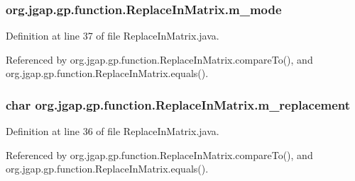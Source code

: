 \hypertarget{classorg_1_1jgap_1_1gp_1_1function_1_1_replace_in_matrix_a749c150c6409342183985395407a18df}{
\subsubsection[{m\-\_\-mode}]{ org.\-jgap.\-gp.\-function.\-Replace\-In\-Matrix.\-m\-\_\-mode\hspace{0.3cm}{\ttfamily [private]}}}\label{classorg_1_1jgap_1_1gp_1_1function_1_1_replace_in_matrix_a749c150c6409342183985395407a18df}


Definition at line 37 of file Replace\-In\-Matrix.\-java.



Referenced by org.\-jgap.\-gp.\-function.\-Replace\-In\-Matrix.\-compare\-To(), and org.\-jgap.\-gp.\-function.\-Replace\-In\-Matrix.\-equals().

\hypertarget{classorg_1_1jgap_1_1gp_1_1function_1_1_replace_in_matrix_ac914d2508754df3d14edd2b4b946cb9e}{
\subsubsection[{m\-\_\-replacement}]{\setlength{\rightskip}{0pt plus 5cm}char org.\-jgap.\-gp.\-function.\-Replace\-In\-Matrix.\-m\-\_\-replacement\hspace{0.3cm}{\ttfamily [private]}}}\label{classorg_1_1jgap_1_1gp_1_1function_1_1_replace_in_matrix_ac914d2508754df3d14edd2b4b946cb9e}


Definition at line 36 of file Replace\-In\-Matrix.\-java.



Referenced by org.\-jgap.\-gp.\-function.\-Replace\-In\-Matrix.\-compare\-To(), and org.\-jgap.\-gp.\-function.\-Replace\-In\-Matrix.\-equals().

